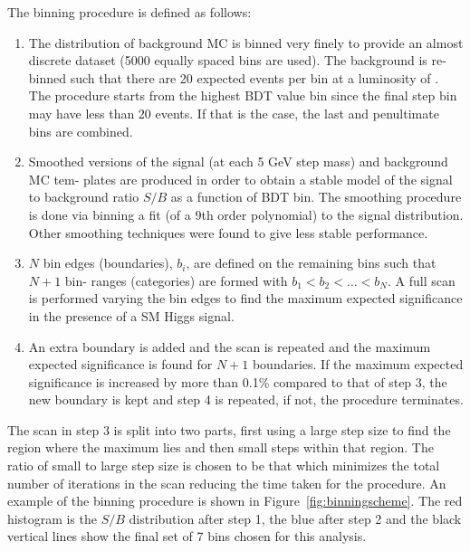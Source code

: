 The binning procedure is defined as follows:

\begin{enumerate}

\item The distribution of background MC is binned very finely to provide an almost discrete
dataset (5000 equally spaced bins are used). The background is re-binned such that there are 20
expected events per bin at a luminosity of \clumi. The procedure starts from the highest BDT
value bin since the final step bin may have less than 20 events. If that is the case, the last and
penultimate bins are combined.
\item Smoothed versions of the signal (at each 5 GeV step mass) and background MC tem-
plates are produced in order to obtain a stable model of the signal to background ratio
$S/B$ as a function of BDT bin.
The smoothing procedure is done via binning a fit (of a 9th order polynomial) to the signal
distribution. Other smoothing techniques were found to give less stable performance.
\item $N$ bin edges (boundaries), $b_{i}$, are defined on the remaining bins such that $N+1$ bin-
ranges (categories) are formed with $b_{1} < b_{2} < \ldots < b_{N}$. A full scan is performed varying the
bin edges to find the maximum expected significance in the presence of a SM Higgs signal. 
\item An extra boundary is added and the scan is repeated and the maximum expected
significance is found for $N+1$ boundaries. If the maximum expected significance  
is increased by more than 0.1\% compared to that of step 3, the new boundary is kept and step 4 
is repeated, if not, the procedure terminates.
\end{enumerate}

The scan in step 3 is split into two parts, first using a large step size to find the 
region where the maximum lies
and then small steps within that region. The ratio of small to large step size is chosen to be that
which minimizes the total number of iterations in the scan reducing the time taken for the procedure.
An example of the binning procedure is shown in Figure~\ref{fig:binningscheme}. 
The red histogram is the $S/B$ distribution after step 1, the 
blue after step 2 and the black vertical lines show the final set of 7 bins chosen for this analysis.

